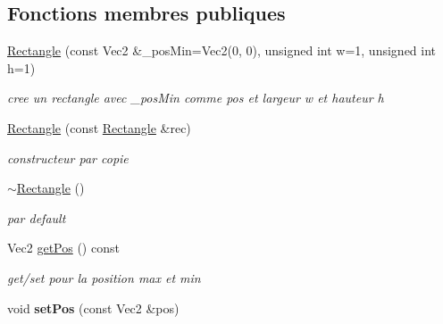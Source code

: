 \subsection*{Fonctions membres publiques}
\begin{DoxyCompactItemize}
\item 
\mbox{\label{class_rectangle_a4f1cd06cacbf4044d1d8cf500c230750}} 
\mbox{\hyperlink{class_rectangle_a4f1cd06cacbf4044d1d8cf500c230750}{Rectangle}} (const Vec2 \&\+\_\+pos\+Min=Vec2(0, 0), unsigned int w=1, unsigned int h=1)
\begin{DoxyCompactList}\small\item\em cree un rectangle avec \+\_\+pos\+Min comme pos et largeur w et hauteur h \end{DoxyCompactList}\item 
\mbox{\label{class_rectangle_a4689a7041fef3b935a2c5e9129f9dfb5}} 
\mbox{\hyperlink{class_rectangle_a4689a7041fef3b935a2c5e9129f9dfb5}{Rectangle}} (const \mbox{\hyperlink{class_rectangle}{Rectangle}} \&rec)
\begin{DoxyCompactList}\small\item\em constructeur par copie \end{DoxyCompactList}\item 
\mbox{\label{class_rectangle_a494c076b13aadf26efdce07d23c61ddd}} 
\mbox{\hyperlink{class_rectangle_a494c076b13aadf26efdce07d23c61ddd}{$\sim$\+Rectangle}} ()
\begin{DoxyCompactList}\small\item\em par default \end{DoxyCompactList}\item 
\mbox{\label{class_rectangle_af9782cc2a5f34744beda1443efcddccc}} 
Vec2 \mbox{\hyperlink{class_rectangle_af9782cc2a5f34744beda1443efcddccc}{get\+Pos}} () const
\begin{DoxyCompactList}\small\item\em get/set pour la position max et min \end{DoxyCompactList}\item 
\mbox{\label{class_rectangle_a91792d1be723462563766efd4bb382de}} 
void {\bfseries set\+Pos} (const Vec2 \&pos)
\item 
\mbox{\label{class_rectangle_abd59609e7c494d57f74b1ee46df33f80}} 

\end{DoxyCompactItemize}
